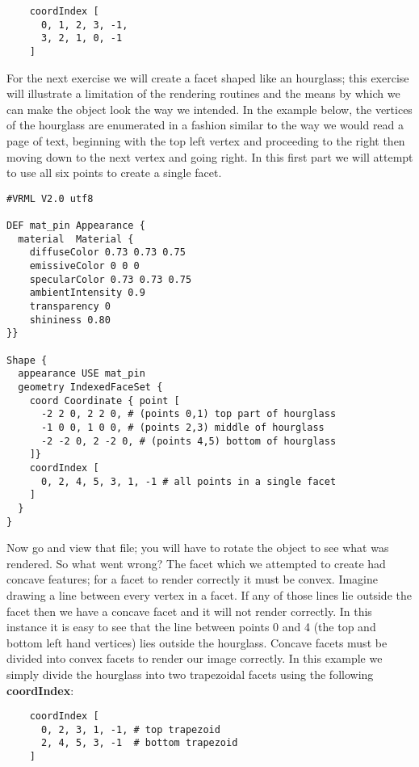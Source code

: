 \documentclass[a4paper]{article}
\begin{document}
\begin{verbatim}
    coordIndex [
      0, 1, 2, 3, -1,
      3, 2, 1, 0, -1
    ]
\end{verbatim}

For the next exercise we will create a facet shaped like an hourglass; this exercise will illustrate a limitation of the rendering
routines and the means by which we can make the object look the way we intended. In the example below, the vertices of the hourglass
are enumerated in a fashion similar to the way we would read a page of text, beginning with the top left vertex and proceeding to the
right then moving down to the next vertex and going right. In this first part we will attempt to use all six points to create a single
facet.

\begin{verbatim}
#VRML V2.0 utf8

DEF mat_pin Appearance {
  material  Material {
    diffuseColor 0.73 0.73 0.75
    emissiveColor 0 0 0
    specularColor 0.73 0.73 0.75
    ambientIntensity 0.9
    transparency 0
    shininess 0.80
}}

Shape {
  appearance USE mat_pin
  geometry IndexedFaceSet {
    coord Coordinate { point [
      -2 2 0, 2 2 0, # (points 0,1) top part of hourglass
      -1 0 0, 1 0 0, # (points 2,3) middle of hourglass
      -2 -2 0, 2 -2 0, # (points 4,5) bottom of hourglass
    ]}
    coordIndex [
      0, 2, 4, 5, 3, 1, -1 # all points in a single facet
    ]
  }
}
\end{verbatim}

Now go and view that file; you will have to rotate the object to see what was rendered.  So what went wrong?
The facet which we attempted to create had concave features; for a facet to render correctly it must be convex.
Imagine drawing a line between every vertex in a facet. If any of those lines lie outside the facet then we
have a concave facet and it will not render correctly. In this instance it is easy to see that the line between
points 0 and 4 (the top and bottom left hand vertices) lies outside the hourglass. Concave facets must be
divided into convex facets to render our image correctly. In this example we simply divide the hourglass into
two trapezoidal facets using the following \textbf{coordIndex}:

\begin{verbatim}
    coordIndex [
      0, 2, 3, 1, -1, # top trapezoid
      2, 4, 5, 3, -1  # bottom trapezoid
    ]
\end{verbatim}
\end{document}
